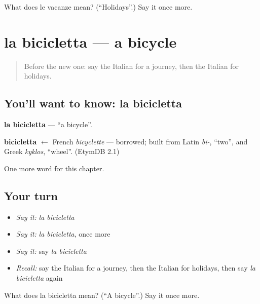 \begin{tcolorbox}[breakable,colback=teal!4,colframe=teal!35!black,title={Before you move on}]
What does le vacanze mean? (\textquotedblleft{}Holidays\textquotedblright{}.) Say it once more.
\end{tcolorbox}
\section[la bicicletta]{la bicicletta — a bicycle}

\label{lesson:IT-C93-bicicletta}



\begin{quote}
Before the new one: say the Italian for a journey, then the Italian for holidays.
\end{quote}

\subsection*{You'll want to know: la bicicletta}
\textbf{la bicicletta} — \textquotedblleft{}a bicycle\textquotedblright{}.

\begin{cousinweb}
\textbf{bicicletta} $\leftarrow$ French \emph{bicyclette} — borrowed; built from Latin \emph{bi-}, \textquotedblleft{}two\textquotedblright{}, and Greek \emph{kyklos}, \textquotedblleft{}wheel\textquotedblright{}. (EtymDB 2.1)
\end{cousinweb}

\begin{grammarlens}[title={What you've built}]
One more word for this chapter.
\end{grammarlens}

\subsection*{Your turn}
\begin{itemize}
\raggedright
  \item \emph{Say it:} \emph{la bicicletta}
  \item \emph{Say it:} \emph{la bicicletta}, once more
  \item \emph{Say it:} say \emph{la bicicletta}
  \item \emph{Recall:} say the Italian for a journey, then the Italian for holidays, then say \emph{la bicicletta} again
\end{itemize}

\begin{tcolorbox}[breakable,colback=teal!4,colframe=teal!35!black,title={Before you move on}]
What does la bicicletta mean? (\textquotedblleft{}A bicycle\textquotedblright{}.) Say it once more.
\end{tcolorbox}
